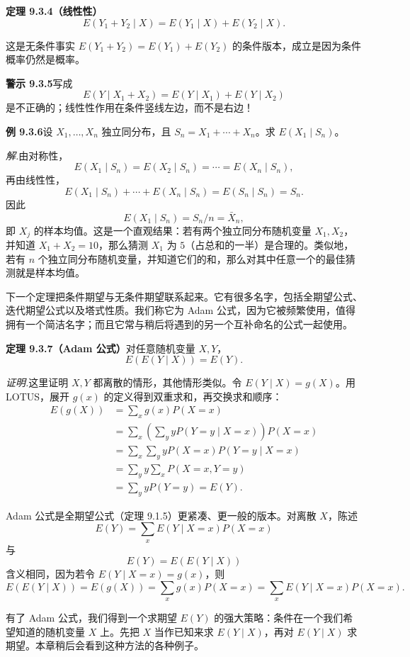 \documentclass[UTF8, 12pt, fontset=fandol, oneside]{ctexart}
\begin{document}
\noindent\textbf{定理 9.3.4（线性性）}\quad
\[
  E(Y_1+Y_2\mid X)=E(Y_1\mid X)+E(Y_2\mid X).
\]

这是无条件事实 $E(Y_1+Y_2)=E(Y_1)+E(Y_2)$ 的条件版本，成立是因为条件概率仍然是概率。

\noindent\textbf{警示 9.3.5}\quad 写成
\[
  E(Y\mid X_1+X_2)=E(Y\mid X_1)+E(Y\mid X_2)
\]
是不正确的；线性性作用在条件竖线左边，而不是右边！

\noindent\textbf{例 9.3.6}\quad 设 $X_1,\ldots,X_n$ 独立同分布，且 $S_n=X_1+\cdots+X_n$。求 $E(X_1\mid S_n)$。

\noindent\textit{解.}\quad 由对称性，
\[
  E(X_1\mid S_n)=E(X_2\mid S_n)=\cdots=E(X_n\mid S_n),
\]
再由线性性，
\[
  E(X_1\mid S_n)+\cdots+E(X_n\mid S_n)=E(S_n\mid S_n)=S_n.
\]
因此
\[
  E(X_1\mid S_n)=S_n/n=\bar X_n,
\]
即 $X_j$ 的样本均值。这是一个直观结果：若有两个独立同分布随机变量 $X_1,X_2$，并知道 $X_1+X_2=10$，那么猜测 $X_1$ 为 $5$（占总和的一半）是合理的。类似地，若有 $n$ 个独立同分布随机变量，并知道它们的和，那么对其中任意一个的最佳猜测就是样本均值。

下一个定理把条件期望与无条件期望联系起来。它有很多名字，包括全期望公式、迭代期望公式以及塔式性质。我们称它为 Adam 公式，因为它被频繁使用，值得拥有一个简洁名字；而且它常与稍后将遇到的另一个互补命名的公式一起使用。

\noindent\textbf{定理 9.3.7（Adam 公式）}\quad 对任意随机变量 $X,Y$，
\[
  E(E(Y\mid X))=E(Y).
\]

\noindent\textit{证明.}\quad 这里证明 $X,Y$ 都离散的情形，其他情形类似。令 $E(Y\mid X)=g(X)$。用 LOTUS，展开 $g(x)$ 的定义得到双重求和，再交换求和顺序：
\[
\begin{aligned}
  E(g(X))
  &=\sum_x g(x)P(X=x)\\
  &=\sum_x\left(\sum_y yP(Y=y\mid X=x)\right)P(X=x)\\
  &=\sum_x\sum_y yP(X=x)P(Y=y\mid X=x)\\
  &=\sum_y y\sum_x P(X=x,Y=y)\\
  &=\sum_y yP(Y=y)=E(Y).
\end{aligned}
\]

Adam 公式是全期望公式（定理 9.1.5）更紧凑、更一般的版本。对离散 $X$，陈述
\[
  E(Y)=\sum_x E(Y\mid X=x)P(X=x)
\]
与
\[
  E(Y)=E(E(Y\mid X))
\]
含义相同，因为若令 $E(Y\mid X=x)=g(x)$，则
\[
  E(E(Y\mid X))=E(g(X))
  =\sum_x g(x)P(X=x)
  =\sum_x E(Y\mid X=x)P(X=x).
\]

有了 Adam 公式，我们得到一个求期望 $E(Y)$ 的强大策略：条件在一个我们希望知道的随机变量 $X$ 上。先把 $X$ 当作已知来求 $E(Y\mid X)$，再对 $E(Y\mid X)$ 求期望。本章稍后会看到这种方法的各种例子。
\end{document}
